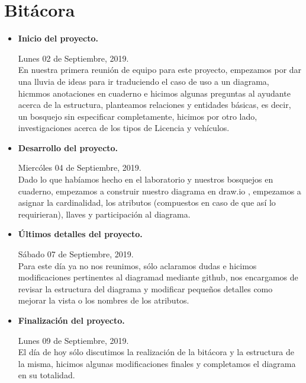 \documentclass[letterpaper,11pt]{article}
\begin{document}
\section{Bitácora}
\begin{itemize}
    \item \textbf{Inicio del proyecto.}

    Lunes 02 de Septiembre, 2019.\\
    En nuestra primera reunión de equipo para este proyecto, empezamos por dar una lluvia de ideas para ir traduciendo el caso de uso a un diagrama, hicmmos anotaciones en cuaderno e hicimos algunas preguntas al ayudante acerca de la estructura, planteamos relaciones y entidades básicas, es decir, un bosquejo sin especificar completamente, hicimos por otro lado, investigaciones acerca de los tipos de Licencia y vehículos.

    \item \textbf{Desarrollo del proyecto.}

    Miercóles 04 de Septiembre, 2019.\\
    Dado lo que habíamos hecho en el laboratorio y nuestros bosquejos en cuaderno, empezamos a construir nuestro diagrama en draw.io , empezamos a asignar la cardinalidad, los atributos (compuestos en caso de que así lo requirieran), llaves y participación al diagrama.


    \item \textbf{Últimos detalles del proyecto.}

    Sábado 07 de Septiembre, 2019.\\
    Para este día ya no nos reunimos, sólo aclaramos dudas e hicimos modificaciones pertinentes al diagramad mediante github, nos encargamos de revisar la estructura del diagrama y modificar pequeños detalles como mejorar la vista o los nombres de los atributos.

    \item \textbf{Finalización del proyecto.}

    Lunes 09 de Septiembre, 2019.\\
    El día de hoy sólo discutimos la realización de la bitácora y la estructura de la misma, hicimos algunas modificaciones finales y completamos el diagrama en su totalidad.

\end{itemize}
\end{document}

